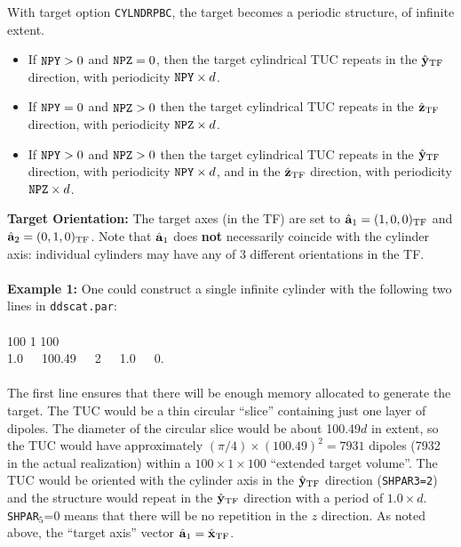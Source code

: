 	With target option {\tt CYLNDRPBC}, the target
	becomes a periodic structure, of infinite extent.
	\begin{itemize}
	\item If ${\tt NPY}>0$ and ${\tt NPZ}=0$, 
              then the target cylindrical TUC
              repeats in the $\hat{\bf y}_{\rm TF}$ direction,
	      with periodicity ${\tt NPY}\times d$.
        \item If ${\tt NPY}=0$ and ${\tt NPZ}>0$
	      then the target cylindrical TUC
	      repeats in the $\hat{\bf z}_{\rm TF}$ direction,
	       with periodicity ${\tt NPZ}\times d$.
        \item If ${\tt NPY}>0$ and ${\tt NPZ}>0$
	      then the target cylindrical TUC
	      repeats in the $\hat{\bf y}_{\rm TF}$ direction,
	      with periodicity ${\tt NPY}\times d$, and in
	      the $\hat{\bf z}_{\rm TF}$ direction,
	       with periodicity ${\tt NPZ}\times d$.
        \end{itemize}

	\noindent
	{\bf Target Orientation:} The target axes (in the TF) 
	are set to ${\hat{\bf a}}_1 = (1,0,0)_{\rm TF}$
	and
	${\hat{\bf a}}_2 = (0,1,0)_{\rm TF}$.
        Note that ${\hat{\bf a}}_1$ does {\bf not} necessarily
	coincide with the cylinder axis: individual
	cylinders may have any of 3 different orientations in the TF.\\
	\ \\

	\noindent
	{\bf Example 1:} One could construct a single infinite cylinder
	with the following two lines in {\tt ddscat.par}:\\
	\ \\
	100  1 100 \\
	1.0\ \ \  100.49\ \ \  2\ \ \  1.0\ \ \  0.\\
	\ \\
	The first line ensures that there will be enough memory allocated
	to generate the target.
	The TUC would be a thin circular ``slice'' containing just one layer
	of dipoles.  The diameter of the circular slice would be about 
	100.49$d$ in
	extent, so the TUC would have approximately
	$(\pi/4)\times(100.49)^2=7931$ dipoles 
	(7932 in the actual realization) within a $100\times1\times100$
	``extended target volume''.
	The TUC would be oriented with the cylinder axis in the $\hat{\bf y}_{\rm TF}$ 
        direction
	({\tt SHPAR3=2}) and the structure would repeat in the $\hat{\bf y}_{\rm TF}$
         direction
	with a period of $1.0\times d$.
	{\tt SHPAR}$_5$=0 means that there will be no repetition in the $z$
	direction.
	As noted above, the ``target axis'' vector 
	$\hat{\bf a}_1 = \hat{\bf x}_{\rm TF}$.
	
